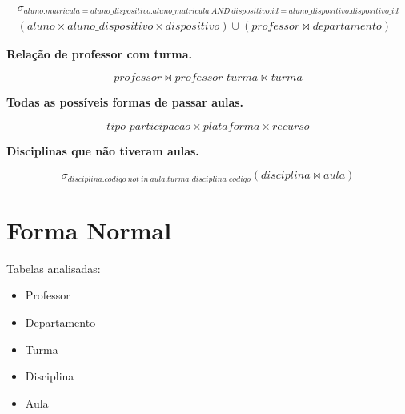 \documentclass[12pt]{article}
\begin{document}
\begin{equation}
\begin{split}
    \sigma_{aluno.matricula = aluno\_dispositivo.aluno\_matricula\ AND\ dispositivo.id = aluno\_dispositivo.dispositivo\_id} \\
    (aluno \times aluno\_dispositivo \times dispositivo) \cup (professor \bowtie departamento)
\end{split}
\end{equation}

\noindent \textbf{Relação de professor com turma.}

\begin{equation}
    professor \bowtie professor\_turma \bowtie turma
\end{equation}

\noindent \textbf{Todas as possíveis formas de passar aulas.}

\begin{equation}
    tipo\_participacao \times plataforma \times recurso
\end{equation}

\noindent \textbf{Disciplinas que não tiveram aulas.}

\begin{equation}
    \sigma_{disciplina.codigo\ not\ in\ aula.turma\_disciplina\_codigo}(disciplina \bowtie aula)
\end{equation}

\section*{Forma Normal}
Tabelas analisadas:

\begin{itemize}
    \setlength\itemsep{0.1em}
    \item Professor
    \item Departamento
    \item Turma
    \item Disciplina
    \item Aula
\end{itemize}
\end{document}
